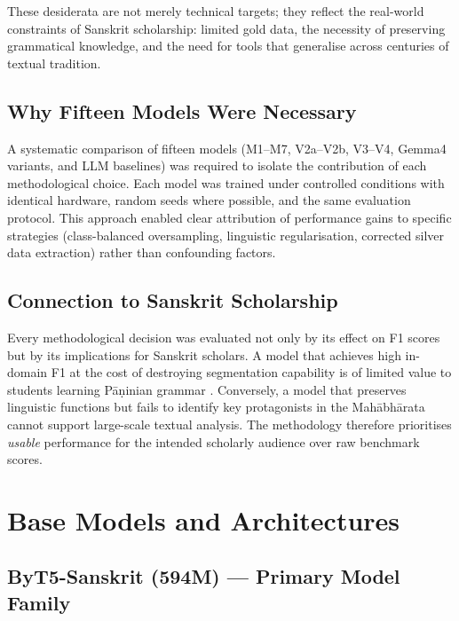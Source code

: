These desiderata are not merely technical targets; they reflect the real-world constraints of Sanskrit scholarship: limited gold data, the necessity of preserving grammatical knowledge, and the need for tools that generalise across centuries of textual tradition.

\subsection{Why Fifteen Models Were Necessary}
\label{subsec:fifteen_models}

A systematic comparison of fifteen models (M1--M7, V2a--V2b, V3--V4, Gemma4 variants, and LLM baselines) was required to isolate the contribution of each methodological choice. Each model was trained under controlled conditions with identical hardware, random seeds where possible, and the same evaluation protocol. This approach enabled clear attribution of performance gains to specific strategies (class-balanced oversampling, linguistic regularisation, corrected silver data extraction) rather than confounding factors.

\subsection{Connection to Sanskrit Scholarship}
\label{subsec:scholarship_connection}

Every methodological decision was evaluated not only by its effect on F1 scores but by its implications for Sanskrit scholars. A model that achieves high in-domain F1 at the cost of destroying segmentation capability is of limited value to students learning Pāṇinian grammar \cite{sastras}. Conversely, a model that preserves linguistic functions but fails to identify key protagonists in the Mahābhārata \cite{mahabharata} cannot support large-scale textual analysis. The methodology therefore prioritises \textit{usable} performance for the intended scholarly audience over raw benchmark scores.

\section{Base Models and Architectures}
\label{sec:base_models}

\subsection{ByT5-Sanskrit (594M) — Primary Model Family}
\label{subsec:byt5_sanskrit}

